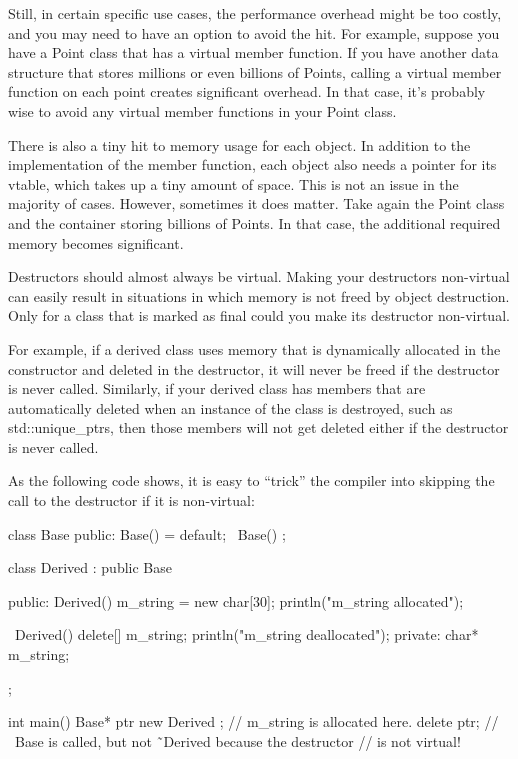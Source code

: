 Still, in certain specific use cases, the performance overhead might be too costly, and you may need to have an option to avoid the hit. For example, suppose you have a Point class that has a virtual member function. If you have another data structure that stores millions or even billions of Points, calling a virtual member function on each point creates significant overhead. In that case, it’s probably wise to avoid any virtual member functions in your Point class.

There is also a tiny hit to memory usage for each object. In addition to the implementation of the member function, each object also needs a pointer for its vtable, which takes up a tiny amount of space. This is not an issue in the majority of cases. However, sometimes it does matter. Take again the Point class and the container storing billions of Points. In that case, the additional required memory becomes significant.


Destructors should almost always be virtual. Making your destructors non-virtual can easily result in situations in which memory is not freed by object destruction. Only for a class that is marked as final could you make its destructor non-virtual.

For example, if a derived class uses memory that is dynamically allocated in the constructor and deleted in the destructor, it will never be freed if the destructor is never called. Similarly, if your derived class has members that are automatically deleted when an instance of the class is destroyed, such as std::unique\_ptrs, then those members will not get deleted either if the destructor is never called.

As the following code shows, it is easy to “trick” the compiler into skipping the call to the destructor if it is non-virtual:

\begin{cpp}
class Base
{
    public:
        Base() = default;
        ~Base() {}
};

class Derived : public Base
{
    public:
        Derived()
        {
            m_string = new char[30];
            println("m_string allocated");
        }

        ~Derived()
        {
            delete[] m_string;
            println("m_string deallocated");
        }
    private:
        char* m_string;
};

int main()
{
    Base* ptr { new Derived {} }; // m_string is allocated here.
    delete ptr; // ~Base is called, but not ˜Derived because the destructor
                // is not virtual!
}
\end{cpp}

